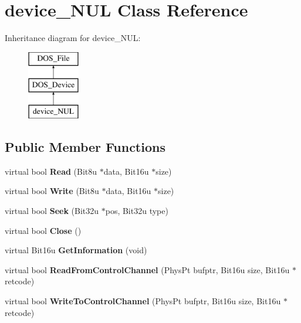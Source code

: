 \hypertarget{classdevice__NUL}{\section{device\-\_\-\-N\-U\-L Class Reference}
\label{classdevice__NUL}
}
Inheritance diagram for device\-\_\-\-N\-U\-L\-:\begin{figure}[H]
\begin{center}
\leavevmode
\includegraphics[height=3.000000cm]{classdevice__NUL}
\end{center}
\end{figure}
\subsection*{Public Member Functions}
\begin{DoxyCompactItemize}
\item 
\hypertarget{classdevice__NUL_aaf931d3a6dc16b812aa376b7ee186ce8}{virtual bool {\bfseries Read} (Bit8u $\ast$data, Bit16u $\ast$size)}\label{classdevice__NUL_aaf931d3a6dc16b812aa376b7ee186ce8}

\item 
\hypertarget{classdevice__NUL_aabfebd4985c2427497546d0ba2ced5fd}{virtual bool {\bfseries Write} (Bit8u $\ast$data, Bit16u $\ast$size)}\label{classdevice__NUL_aabfebd4985c2427497546d0ba2ced5fd}

\item 
\hypertarget{classdevice__NUL_ad66c8e8c09d7ce0d448ad528c960fc23}{virtual bool {\bfseries Seek} (Bit32u $\ast$pos, Bit32u type)}\label{classdevice__NUL_ad66c8e8c09d7ce0d448ad528c960fc23}

\item 
\hypertarget{classdevice__NUL_aad4da7282f73d1966125caac162212bd}{virtual bool {\bfseries Close} ()}\label{classdevice__NUL_aad4da7282f73d1966125caac162212bd}

\item 
\hypertarget{classdevice__NUL_a96c2622ea2311a3421842a9d8ccaec6a}{virtual Bit16u {\bfseries Get\-Information} (void)}\label{classdevice__NUL_a96c2622ea2311a3421842a9d8ccaec6a}

\item 
\hypertarget{classdevice__NUL_a48106c51a36d8c53365856b92f01ceb2}{virtual bool {\bfseries Read\-From\-Control\-Channel} (Phys\-Pt bufptr, Bit16u size, Bit16u $\ast$retcode)}\label{classdevice__NUL_a48106c51a36d8c53365856b92f01ceb2}

\item 
\hypertarget{classdevice__NUL_af4643f37c69d61171299703844ed674b}{virtual bool {\bfseries Write\-To\-Control\-Channel} (Phys\-Pt bufptr, Bit16u size, Bit16u $\ast$retcode)}\label{classdevice__NUL_af4643f37c69d61171299703844ed674b}

\end{DoxyCompactItemize}


